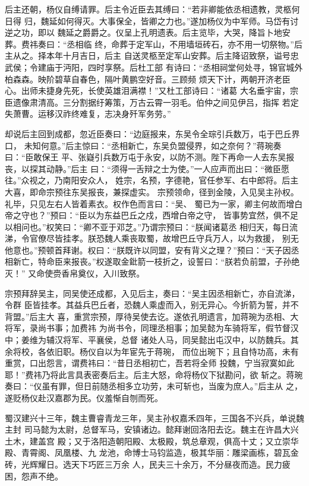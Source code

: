 后主还朝，杨仪自缚请罪。后主令近臣去其缚曰：“若非卿能依丞相遗教，灵柩何日得
归，魏延如何得灭。大事保全，皆卿之力也。”遂加杨仪为中军师。马岱有讨逆之功，即以
魏延之爵爵之。仪呈上孔明遗表。后主览毕，大哭，降旨卜地安葬。费祎奏曰：“丞相临
终，命葬于定军山，不用墙垣砖石，亦不用一切祭物。”后主从之。择本年十月吉日，后主
自送灵柩至定军山安葬。后主降诏致祭，谥号忠武侯；令建庙于沔阳，四时享祭。后杜工部
有诗曰：“丞相祠堂何处寻，锦官城外柏森森。映阶碧草自春色，隔叶黄鹏空好音。三顾频
烦天下计，两朝开济老臣心。出师未捷身先死，长使英雄泪满襟！”又杜工部诗曰：“诸葛
大名垂宇宙，宗臣遗像肃清高。三分割据纡筹策，万古云霄一羽毛。伯仲之间见伊吕，指挥
若定失萧曹。运移汉祚终难复，志决身歼军务劳。”

却说后主回到成都，忽近臣奏曰：“边庭报来，东吴令全琮引兵数万，屯于巴丘界口，
未知何意。”后主惊曰：“丞相新亡，东吴负盟侵界，如之奈何？”蒋琬奏曰：“臣敢保王
平、张嶷引兵数万屯于永安，以防不测。陛下再命一人去东吴报丧，以探其动静。”后主
曰：“须得一舌辩之士为使。”一人应声而出曰：“微臣愿往。”众视之，乃南阳安众人，
姓宗，名预，字德艳，官任参军、右中郎将。后主大喜，即命宗预往东吴报丧，兼探虚实。
宗预领命，径到金陵，入见吴主孙权。礼毕，只见左右人皆着素衣。权作色而言曰：“吴、
蜀已为一家，卿主何故而增白帝之守也？”预曰：“臣以为东益巴丘之戍，西增白帝之守，
皆事势宜然，俱不足以相问也。”权笑曰：“卿不亚于邓芝。”乃谓宗预曰：“朕闻诸葛丞
相归天，每日流涕，令官僚尽皆挂孝。朕恐魏人乘丧取蜀，故增巴丘守兵万人，以为救援，
别无他意也。”预顿首拜谢。权曰：“朕既许以同盟，安有背义之理？”预曰：“天子因丞
相新亡，特命臣来报丧。”权遂取金鈚箭一枝折之，设誓曰：“朕若负前盟，子孙绝灭！”
又命使赍香帛奠仪，入川致祭。

宗预拜辞吴主，同吴使还成都，入见后主，奏曰：“吴主因丞相新亡，亦自流涕，令群
臣皆挂孝。其益兵巴丘者，恐魏人乘虚而入，别无异心。今折箭为誓，并不背盟。”后主大
喜，重赏宗预，厚待吴使去讫。遂依孔明遗言，加蒋琬为丞相、大将军，录尚书事；加费祎
为尚书令，同理丞相事；加吴懿为车骑将军，假节督汉中；姜维为辅汉将军、平襄侯，总督
诸处人马，同吴懿出屯汉中，以防魏兵。其余将校，各依旧职。杨仪自以为年宦先于蒋琬，
而位出琬下；且自恃功高，未有重赏，口出怨言，谓费祎曰：“昔日丞相初亡，吾若将全师
投魏，宁当寂寞如此耶！”费祎乃将此言具表密奏后主。后主大怒，命将杨仪下狱勘问，欲
斩之。蒋琬奏曰：“仪虽有罪，但日前随丞相多立功劳，未可斩也，当废为庶人。”后主从
之，遂贬杨仪赴汉嘉郡为民。仪羞惭自刎而死。

蜀汉建兴十三年，魏主曹睿青龙三年，吴主孙权嘉禾四年，三国各不兴兵，单说魏主封
司马懿为太尉，总督军马，安镇诸边。懿拜谢回洛阳去讫。魏主在许昌大兴土木，建盖宫
殿；又于洛阳造朝阳殿、太极殿，筑总章观，俱高十丈；又立崇华殿、青霄阁、凤凰楼、九
龙池，命博士马钧监造，极其华丽：雕梁画栋，碧瓦金砖，光辉耀日。选天下巧匠三万余
人，民夫三十余万，不分昼夜而造。民力疲困，怨声不绝。

